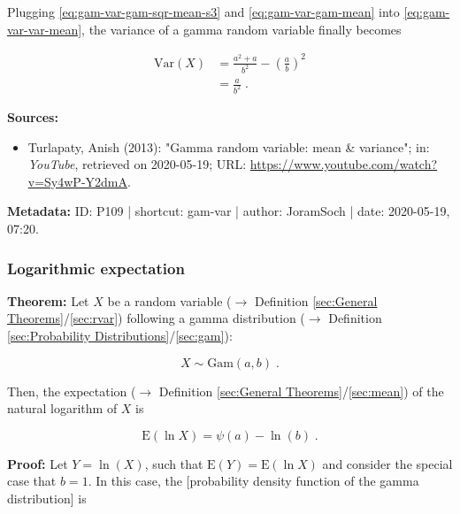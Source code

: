 \documentclass[a4paper,12pt,twoside]{book}
\begin{document}
Plugging \eqref{eq:gam-var-gam-sqr-mean-s3} and \eqref{eq:gam-var-gam-mean} into \eqref{eq:gam-var-var-mean}, the variance of a gamma random variable finally becomes

\begin{equation} \label{eq:gam-var-gam-var-qed}
\begin{split}
\mathrm{Var}(X) &= \frac{a^2+a}{b^2} - \left( \frac{a}{b} \right)^2 \\
&= \frac{a}{b^2} \; .
\end{split}
\end{equation}


\vspace{1em}
\textbf{Sources:}
\begin{itemize}
\item Turlapaty, Anish (2013): "Gamma random variable: mean \& variance"; in: \textit{YouTube}, retrieved on 2020-05-19; URL: \url{https://www.youtube.com/watch?v=Sy4wP-Y2dmA}.
\end{itemize}


\vspace{1em}
\textbf{Metadata:} ID: P109 | shortcut: gam-var | author: JoramSoch | date: 2020-05-19, 07:20.
\vspace{1em}



\subsubsection[\textbf{Logarithmic expectation}]{Logarithmic expectation} \label{sec:gam-logmean}
\setcounter{equation}{0}

\textbf{Theorem:} Let $X$ be a random variable ($\rightarrow$ Definition \ref{sec:General Theorems}/\ref{sec:rvar}) following a gamma distribution ($\rightarrow$ Definition \ref{sec:Probability Distributions}/\ref{sec:gam}):

\begin{equation} \label{eq:gam-logmean-gam}
X \sim \mathrm{Gam}(a, b) \; .
\end{equation}

Then, the expectation ($\rightarrow$ Definition \ref{sec:General Theorems}/\ref{sec:mean}) of the natural logarithm of $X$ is

\begin{equation} \label{eq:gam-logmean-gam-logmean}
\mathrm{E}(\ln X) = \psi(a) - \ln(b) \; .
\end{equation}


\vspace{1em}
\textbf{Proof:} Let $Y = \ln(X)$, such that $\mathrm{E}(Y) = \mathrm{E}(\ln X)$ and consider the special case that $b = 1$. In this case, the [probability density function of the gamma distribution] is
\end{document}

